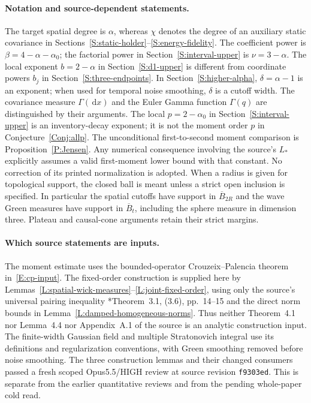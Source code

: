 \documentclass[12pt]{article}
\numberwithin{equation}{section}
\theoremstyle{definition}
\newcommand{\ud}{\,\mathrm{d}}
\begin{document}
\paragraph{Notation and source-dependent statements.}
The target spatial degree is $\alpha$, whereas $\chi$ denotes the degree
of an auxiliary static covariance in
Sections~\ref{S:static-holder}--\ref{S:energy-fidelity}.
The coefficient power is $\beta=4-\alpha-\alpha_0$; the factorial power in
Section~\ref{S:interval-upper} is $\nu=3-\alpha$.
The local exponent $b=2-\alpha$ in Section~\ref{S:d1-upper} is different
from coordinate powers $b_j$ in Section~\ref{S:three-endpoints}.
In Section~\ref{S:higher-alpha}, $\delta=\alpha-1$ is an exponent;
when used for temporal noise smoothing, $\delta$ is a cutoff width.
The covariance measure $\Gamma(\ud x)$ and the Euler Gamma function
$\Gamma(q)$ are distinguished by their arguments. The local
$p=2-\alpha_0$ in Section~\ref{S:interval-upper} is an inventory-decay
exponent; it is not the moment order $p$ in Conjecture~\ref{Conj:allp}.
The unconditional first-to-second moment comparison is
Proposition~\ref{P:Jensen}. Any numerical consequence involving the
source's $L_*$ explicitly assumes a valid first-moment lower bound with
that constant. No correction of its printed normalization is adopted.
When a radius is given for topological support, the closed ball is meant
unless a strict open inclusion is specified. In particular the spatial
cutoffs have support in $\overline B_{2R}$ and the wave Green measures
have support in $\overline B_t$, including the sphere measure in dimension
three. Plateau and causal-cone arguments retain their strict margins.

\paragraph{Which source statements are inputs.}
The moment estimate uses the bounded-operator Crouzeix--Palencia
theorem in~\eqref{E:cp-input}. The fixed-order construction is supplied
here by Lemmas~\ref{L:spatial-wick-measures}--\ref{L:joint-fixed-order},
using only the source's universal pairing inequality
\cite{chen:author2026:time-dependency}*{Theorem~3.1, (3.6), pp.~14--15}
and the direct norm bounds in Lemma~\ref{L:damped-homogeneous-norms}.
Thus neither Theorem~4.1 nor Lemma~4.4 nor Appendix~A.1 of the source is
an analytic construction input. The finite-width Gaussian field and
multiple Stratonovich integral use its definitions and regularization
conventions, with Green smoothing removed before noise smoothing.
The three construction lemmas and their changed consumers passed a fresh
scoped Opus5.5/HIGH review at source revision \texttt{f9303ed}. This is
separate from the earlier quantitative reviews and from the pending
whole-paper cold read.
\end{document}
